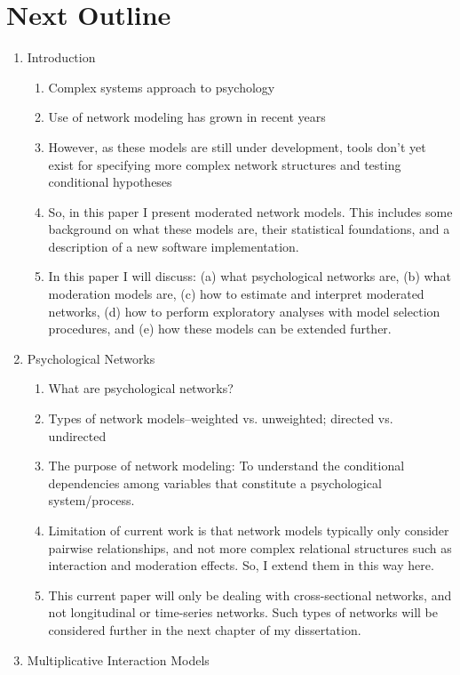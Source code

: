 \chapter{Next Outline}
\begin{enumerate}
    \item Introduction
    \begin{enumerate}
        \item Complex systems approach to psychology
        \item Use of network modeling has grown in recent years
        \item However, as these models are still under development, tools don't yet exist for specifying more complex network structures and testing conditional hypotheses
        \item So, in this paper I present moderated network models. This includes some background on what these models are, their statistical foundations, and a description of a new software implementation. 
        \item In this paper I will discuss: (a) what psychological networks are, (b) what moderation models are, (c) how to estimate and interpret moderated networks, (d) how to perform exploratory analyses with model selection procedures, and (e) how these models can be extended further.
    \end{enumerate}
    \item Psychological Networks
    \begin{enumerate}
        \item What are psychological networks?
        \item Types of network models--weighted vs. unweighted; directed vs. undirected
        \item The purpose of network modeling: To understand the conditional dependencies among variables that constitute a psychological system/process.
        \item Limitation of current work is that network models typically only consider pairwise relationships, and not more complex relational structures such as interaction and moderation effects. So, I extend them in this way here.
        \item This current paper will only be dealing with cross-sectional networks, and not longitudinal or time-series networks. Such types of networks will be considered further in the next chapter of my dissertation.
    \end{enumerate}
    \item Multiplicative Interaction Models

\end{enumerate}
